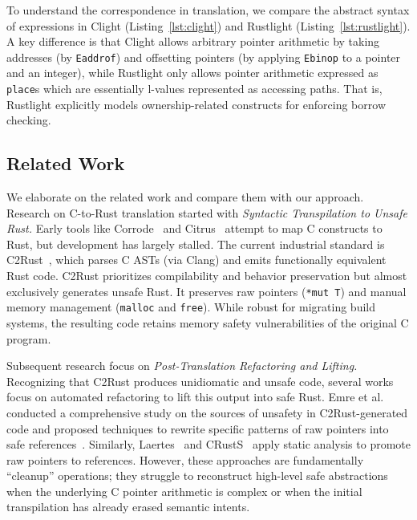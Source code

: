 \documentclass{llncs} %
\begin{document}
To understand the correspondence in translation, we compare the
abstract syntax of expressions in Clight (Listing~\ref{lst:clight})
and Rustlight (Listing~\ref{lst:rustlight}). A key difference is that
Clight allows arbitrary pointer arithmetic by taking addresses (by
\texttt{Eaddrof}) and offsetting pointers (by applying \texttt{Ebinop}
to a pointer and an integer), while Rustlight only allows pointer
arithmetic expressed as \texttt{place}s which are
essentially l-values represented as accessing paths.
%
That is, Rustlight explicitly models ownership-related constructs for
enforcing borrow checking.



\subsection{Related Work}

We elaborate on the related work and compare them with our approach.
Research on C-to-Rust translation started with \emph{Syntactic Transpilation to Unsafe Rust.}
%
Early tools like Corrode~\cite{Corrode} and Citrus~\cite{Citrus} attempt to map C constructs to Rust, but development has largely stalled. The current industrial standard is C2Rust~\cite{C2Rust}, which parses C ASTs (via Clang) and emits functionally equivalent Rust code. C2Rust prioritizes compilability and behavior preservation but almost exclusively generates unsafe Rust. It preserves raw pointers (\texttt{*mut T}) and manual memory management (\texttt{malloc} and \texttt{free}). While robust for migrating build systems, the resulting code retains memory safety vulnerabilities of the original C program.

Subsequent research focus on \emph{Post-Translation Refactoring and Lifting.}
%
Recognizing that C2Rust produces unidiomatic and unsafe code, several works focus on automated refactoring to lift this output into safe Rust. Emre et al. conducted a comprehensive study on the sources of unsafety in C2Rust-generated code and proposed techniques to rewrite specific patterns of raw pointers into safe references~\cite{Emre2021}. Similarly, Laertes~\cite{Emre2021} and CRustS~\cite{Ling2022} apply static analysis to promote raw pointers to references. However, these approaches are fundamentally ``cleanup'' operations; they struggle to reconstruct high-level safe abstractions when the underlying C pointer arithmetic is complex or when the initial transpilation has already erased semantic intents.
\end{document}
